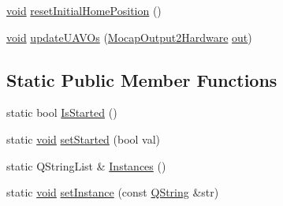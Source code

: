 \begin{DoxyCompactItemize}
\item 
\hyperlink{group___u_a_v_objects_plugin_ga444cf2ff3f0ecbe028adce838d373f5c}{void} \hyperlink{group___mo_cap_plugin_ga4bed3f9d105ae145815a651f02083ea0}{reset\-Initial\-Home\-Position} ()
\item 
\hyperlink{group___u_a_v_objects_plugin_ga444cf2ff3f0ecbe028adce838d373f5c}{void} \hyperlink{group___mo_cap_plugin_ga6ac428e6d5db8fba507314cc56783821}{update\-U\-A\-V\-Os} (\hyperlink{struct_mocap_output2_hardware}{Mocap\-Output2\-Hardware} \hyperlink{uavobjecttemplate_8m_a2a89187d8e8e8fba509ef9ab5f815d88}{out})
\end{DoxyCompactItemize}
\subsection*{Static Public Member Functions}
\begin{DoxyCompactItemize}
\item 
static bool \hyperlink{group___mo_cap_plugin_ga4b693d27267a22d345082b85e2ebe71e}{Is\-Started} ()
\item 
static \hyperlink{group___u_a_v_objects_plugin_ga444cf2ff3f0ecbe028adce838d373f5c}{void} \hyperlink{group___mo_cap_plugin_ga7b3b24d7f35ac822cf8414afbf88854d}{set\-Started} (bool val)
\item 
static Q\-String\-List \& \hyperlink{group___mo_cap_plugin_ga31d137dece30e0f249c4162df4b5b105}{Instances} ()
\item 
static \hyperlink{group___u_a_v_objects_plugin_ga444cf2ff3f0ecbe028adce838d373f5c}{void} \hyperlink{group___mo_cap_plugin_ga8a5fd7b06f55301b2683b72e15ffdd1e}{set\-Instance} (const \hyperlink{group___u_a_v_objects_plugin_gab9d252f49c333c94a72f97ce3105a32d}{Q\-String} \&str)
\end{DoxyCompactItemize}
